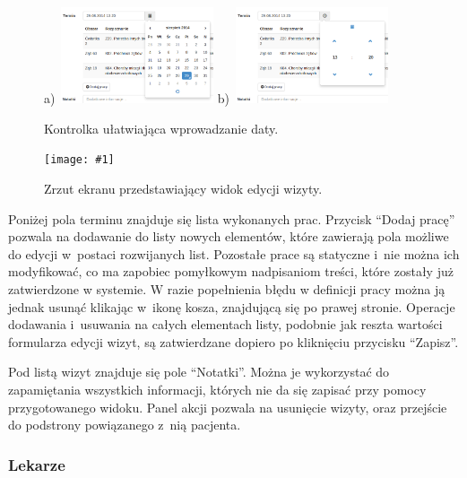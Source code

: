 \documentclass[11pt]{aghdpl}
\newcommand{\fullWidthPicture}[2]{
\begin{figure}[h!]
	\centering
		\texttt{[image: \#1]}
	\caption{#2}
	\label{fig:#1}
\end{figure}
}
\begin{document}
\begin{figure}[h!]
	\begin{center}
		a)~\includegraphics[width=0.4\textwidth]{datePickerDate}
		\hspace{5mm}
		b)~\includegraphics[width=0.4\textwidth]{datePickerTime}
	\end{center}
	\caption{Kontrolka ułatwiająca wprowadzanie daty.}
	\label{fig:datepicker}
\end{figure}

\fullWidthPicture{wizyta}{Zrzut ekranu przedstawiający widok edycji wizyty.}

Poniżej pola terminu znajduje się lista wykonanych prac. Przycisk ``Dodaj pracę'' pozwala na dodawanie do listy nowych elementów, które zawierają pola możliwe do edycji w~postaci rozwijanych list. Pozostałe prace są statyczne i~nie można ich modyfikować, co ma zapobiec pomyłkowym nadpisaniom treści, które zostały już zatwierdzone w systemie. W razie popełnienia błędu w definicji pracy można ją jednak usunąć klikając w~ikonę kosza, znajdującą się po prawej stronie. Operacje dodawania i~usuwania na całych elementach listy, podobnie jak reszta wartości formularza edycji wizyt, są zatwierdzane dopiero po kliknięciu przycisku ``Zapisz''.

Pod listą wizyt znajduje się pole ``Notatki''. Można je wykorzystać do zapamiętania wszystkich informacji, których nie da się zapisać przy pomocy przygotowanego widoku. Panel akcji pozwala na usunięcie wizyty, oraz przejście do podstrony powiązanego z~nią pacjenta.


\subsubsection{Lekarze}
\label{sec:lekarze}
\end{document}
